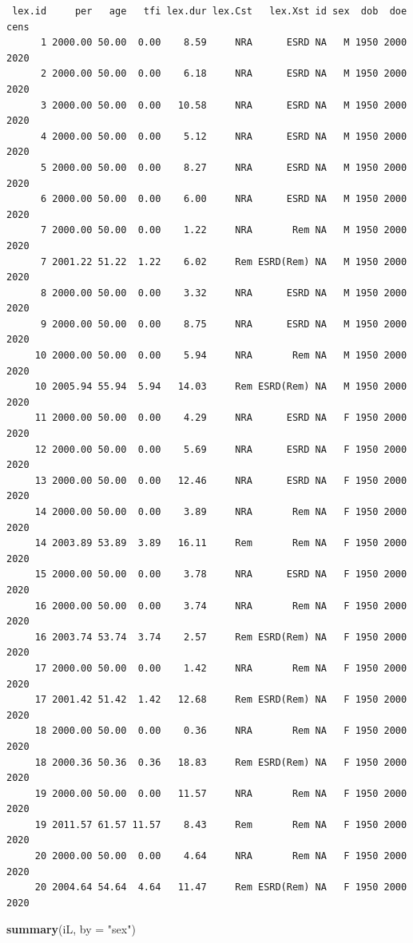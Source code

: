 \documentclass[
]{book}
\newenvironment{Shaded}{\begin{snugshade}}{\end{snugshade}}
\newcommand{\AttributeTok}[1]{\textcolor[rgb]{0.13,0.29,0.53}{#1}}
\newcommand{\FunctionTok}[1]{\textcolor[rgb]{0.13,0.29,0.53}{\textbf{#1}}}
\newcommand{\NormalTok}[1]{#1}
\newcommand{\StringTok}[1]{\textcolor[rgb]{0.31,0.60,0.02}{#1}}
\begin{document}
\begin{enumerate}
\begin{verbatim}
 lex.id     per   age   tfi lex.dur lex.Cst   lex.Xst id sex  dob  doe cens
      1 2000.00 50.00  0.00    8.59     NRA      ESRD NA   M 1950 2000 2020
      2 2000.00 50.00  0.00    6.18     NRA      ESRD NA   M 1950 2000 2020
      3 2000.00 50.00  0.00   10.58     NRA      ESRD NA   M 1950 2000 2020
      4 2000.00 50.00  0.00    5.12     NRA      ESRD NA   M 1950 2000 2020
      5 2000.00 50.00  0.00    8.27     NRA      ESRD NA   M 1950 2000 2020
      6 2000.00 50.00  0.00    6.00     NRA      ESRD NA   M 1950 2000 2020
      7 2000.00 50.00  0.00    1.22     NRA       Rem NA   M 1950 2000 2020
      7 2001.22 51.22  1.22    6.02     Rem ESRD(Rem) NA   M 1950 2000 2020
      8 2000.00 50.00  0.00    3.32     NRA      ESRD NA   M 1950 2000 2020
      9 2000.00 50.00  0.00    8.75     NRA      ESRD NA   M 1950 2000 2020
     10 2000.00 50.00  0.00    5.94     NRA       Rem NA   M 1950 2000 2020
     10 2005.94 55.94  5.94   14.03     Rem ESRD(Rem) NA   M 1950 2000 2020
     11 2000.00 50.00  0.00    4.29     NRA      ESRD NA   F 1950 2000 2020
     12 2000.00 50.00  0.00    5.69     NRA      ESRD NA   F 1950 2000 2020
     13 2000.00 50.00  0.00   12.46     NRA      ESRD NA   F 1950 2000 2020
     14 2000.00 50.00  0.00    3.89     NRA       Rem NA   F 1950 2000 2020
     14 2003.89 53.89  3.89   16.11     Rem       Rem NA   F 1950 2000 2020
     15 2000.00 50.00  0.00    3.78     NRA      ESRD NA   F 1950 2000 2020
     16 2000.00 50.00  0.00    3.74     NRA       Rem NA   F 1950 2000 2020
     16 2003.74 53.74  3.74    2.57     Rem ESRD(Rem) NA   F 1950 2000 2020
     17 2000.00 50.00  0.00    1.42     NRA       Rem NA   F 1950 2000 2020
     17 2001.42 51.42  1.42   12.68     Rem ESRD(Rem) NA   F 1950 2000 2020
     18 2000.00 50.00  0.00    0.36     NRA       Rem NA   F 1950 2000 2020
     18 2000.36 50.36  0.36   18.83     Rem ESRD(Rem) NA   F 1950 2000 2020
     19 2000.00 50.00  0.00   11.57     NRA       Rem NA   F 1950 2000 2020
     19 2011.57 61.57 11.57    8.43     Rem       Rem NA   F 1950 2000 2020
     20 2000.00 50.00  0.00    4.64     NRA       Rem NA   F 1950 2000 2020
     20 2004.64 54.64  4.64   11.47     Rem ESRD(Rem) NA   F 1950 2000 2020
\end{verbatim}

\begin{Shaded}
\begin{Highlighting}[]
\FunctionTok{summary}\NormalTok{(iL, }\AttributeTok{by =} \StringTok{"sex"}\NormalTok{)}
\end{Highlighting}
\end{Shaded}


\end{enumerate}
\end{document}

